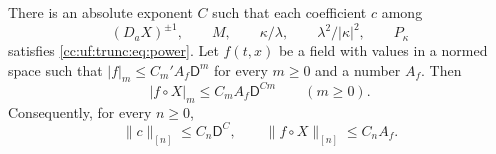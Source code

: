 \begin{proposition}\label{cc:uf:trunc:prop:parent}
There is an absolute exponent $C$ such that each coefficient $c$ among
\[
 (D_aX)^{\pm1},\qquad M,\qquad
 \kappa/\lambda,\qquad \lambda^2/|\kappa|^2,\qquad P_\kappa
\]
satisfies \eqref{cc:uf:trunc:eq:power}. Let $f(t,x)$ be a field with
values in a normed space such that $|f|_m\le C_m'A_f\mathsf D^m$ for
every $m\ge0$ and a number $A_f$. Then
\begin{equation}\label{cc:uf:trunc:eq:parent-composition}
 |f\circ X|_m\le C_mA_f\mathsf D^{Cm}\qquad(m\ge0).
\end{equation}
Consequently, for every $n\ge0$,
\begin{equation}\label{cc:uf:hier:eq:coefficient-bound}
 \|c\|_{[n]}\le C_n\mathsf D^C,\qquad
 \|f\circ X\|_{[n]}\le C_nA_f .
\end{equation}
\end{proposition}
